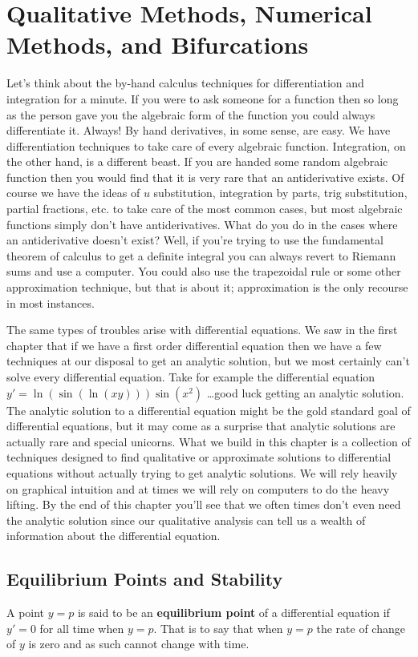 \chapter{Qualitative Methods, Numerical Methods, and Bifurcations}
Let's think about the by-hand calculus techniques for differentiation and integration for
a minute.  If you were to ask someone for a function then so long as the person gave you
the algebraic form of the function you could always differentiate it.  Always! By hand
derivatives, in some sense, are easy.  We have
differentiation techniques to take care of every algebraic function.  Integration, on the
other hand, is a different beast.  If you are handed some random algebraic function then
you would find that it is very rare that an antiderivative exists.  Of course we have the
ideas of $u$ substitution, integration by parts, trig substitution, partial fractions,
etc. to take care of the most common cases, but most algebraic functions simply don't have
antiderivatives.  What do you do in the cases where an antiderivative doesn't exist?
Well, if you're trying to use the fundamental theorem of calculus to get a definite
integral you can always revert to Riemann sums and use a computer. You could also use the
trapezoidal rule or some other approximation technique, but that is about it;
approximation is the only recourse in most instances.

The same types of troubles arise with differential equations.  We saw in the first chapter that if
we have a first order differential equation then we have a few techniques at our disposal
to get an analytic solution,
but we most certainly can't solve every differential equation.  Take for example the
differential equation $y' = \ln(\sin(\ln(xy)))\sin(x^2)$ \ldots good luck getting an
analytic solution.  The analytic solution to a
differential equation might be the gold standard goal of differential equations, but it
may come as a surprise that analytic solutions are actually rare and special unicorns.
What we build in this chapter is a collection of techniques designed to find qualitative
or approximate solutions to differential equations without actually trying to get analytic
solutions.  We will rely heavily on graphical intuition and at times we will rely on
computers to do the heavy lifting. By the end of this chapter you'll see that we often
times don't even need the analytic solution since our qualitative analysis can tell us a
wealth of information about the differential equation.


\newpage \section{Equilibrium Points and Stability}
\begin{definition}
    A point $y=p$ is said to be an {\bf equilibrium point} of a differential equation if
    $y'=0$ for all time when $y=p$.  That is to say that when $y=p$ the rate of change of $y$ is zero
    and as such cannot change with time.
\end{definition}

